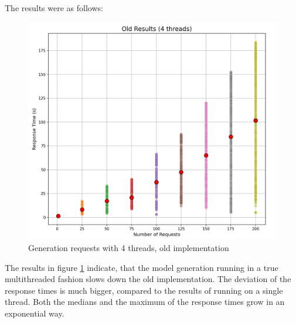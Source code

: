 			The results were as follows:

			\begin{figure}[h!] 
				\begin{center}
					\includegraphics[scale=0.6]{include/imgs/4threads_old.PNG}
					\caption{Generation requests with 4 threads, old implementation}
					\label{4threadsold}	
				\end{center}
			\end{figure}

			The results in figure \ref{4threadsold} indicate, that the model generation running in a true multithreaded fashion slows down the old implementation. The 
			deviation of the response times is much bigger, compared to the results of running on a single thread. Both the medians and the maximum of the response times
			grow in an exponential way.


